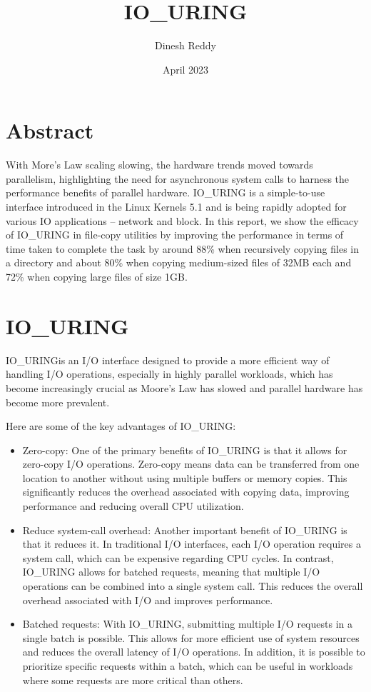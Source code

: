 \documentclass{article}
\title{IO\_URING}
\author{Dinesh Reddy}
\date{April 2023}
\begin{document}
\maketitle
\section{Abstract}
With More’s Law scaling slowing, the hardware trends moved towards parallelism, highlighting the need for asynchronous 
system calls to harness the performance benefits of parallel hardware. IO\_URING is a simple-to-use interface introduced 
in the Linux Kernels 5.1 and is being rapidly adopted for various IO applications -- network and block. In this report, 
we show the efficacy of IO\_URING in file-copy utilities by improving the performance in terms of time taken to complete the 
task by around 88\% when recursively copying files in a directory and about 80\% when copying medium-sized files of 32MB each 
and 72\% when copying large files of size 1GB.

\section{IO\_URING}

IO\_URINGis an I/O interface designed to provide a more efficient way of handling I/O operations, especially in highly 
parallel workloads, which has become increasingly crucial as Moore's Law has slowed and parallel hardware has become more 
prevalent.

Here are some of the key advantages of IO\_URING:
\begin{itemize}
\item Zero-copy: One of the primary benefits of IO\_URING is that it allows for zero-copy I/O operations. 
Zero-copy means data can be transferred from one location to another without using multiple buffers or memory copies. 
This significantly reduces the overhead associated with copying data, improving performance and reducing overall CPU utilization.
\item Reduce system-call overhead: Another important benefit of IO\_URING is that it reduces it. In traditional I/O interfaces, 
each I/O operation requires a system call, which can be expensive regarding CPU cycles. In contrast, IO\_URING allows for batched 
requests, meaning that multiple I/O operations can be combined into a single system call. This reduces the overall overhead 
associated with I/O and improves performance.
\item Batched requests: With IO\_URING, submitting multiple I/O requests in a single batch is possible. This allows for more efficient 
use of system resources and reduces the overall latency of I/O operations. In addition, it is possible to prioritize specific 
requests within a batch, which can be useful in workloads where some requests are more critical than others.
\end{itemize}
\end{document}
